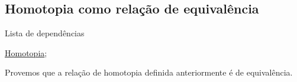 \subsection{Homotopia como relação de equivalência} %
\label{homotopia-relaçao-de-equivalencia-prop}
\begin{titlemize}{Lista de dependências}
	\item \hyperref[homotopia-def]{Homotopia};\\ %
\end{titlemize}


Provemos que a relação de homotopia definida anteriormente é de equivalência.


